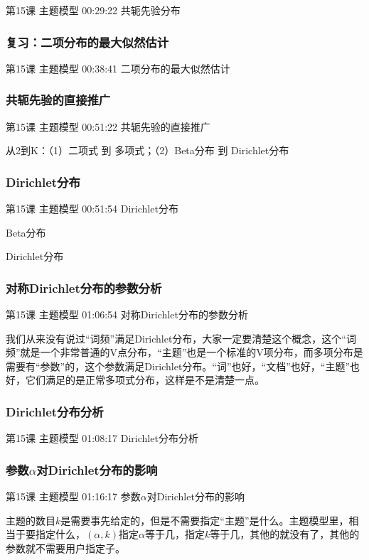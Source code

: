 \documentclass[UTF8]{ctexart}
\begin{document}
第15课 主题模型 00:29:22 共轭先验分布

\subsubsection{复习：二项分布的最大似然估计}

第15课 主题模型 00:38:41 二项分布的最大似然估计

\subsubsection{共轭先验的直接推广}

第15课 主题模型 00:51:22 共轭先验的直接推广

从2到K：（1）二项式   到  多项式；（2）Beta分布 到 Dirichlet分布

\subsubsection{Dirichlet分布}

第15课 主题模型 00:51:54 Dirichlet分布

Beta分布

 Dirichlet分布

\subsubsection{对称Dirichlet分布的参数分析}

第15课 主题模型 01:06:54 对称Dirichlet分布的参数分析

我们从来没有说过“词频”满足Dirichlet分布，大家一定要清楚这个概念，这个“词频”就是一个非常普通的V点分布，“主题”也是一个标准的V项分布，而多项分布是需要有“参数”的，这个参数满足Dirichlet分布。“词”也好，“文档”也好，“主题”也好，它们满足的是正常多项式分布，这样是不是清楚一点。

\subsubsection{Dirichlet分布分析}

第15课 主题模型 01:08:17 Dirichlet分布分析

\subsubsection{参数$\alpha$对Dirichlet分布的影响}

第15课 主题模型 01:16:17 参数$\alpha$对Dirichlet分布的影响

主题的数目$k$是需要事先给定的，但是不需要指定“主题”是什么。主题模型里，相当于要指定什么，$(\alpha , k)$指定$\alpha$等于几，指定$k$等于几，其他的就没有了，其他的参数就不需要用户指定子。
\end{document}
